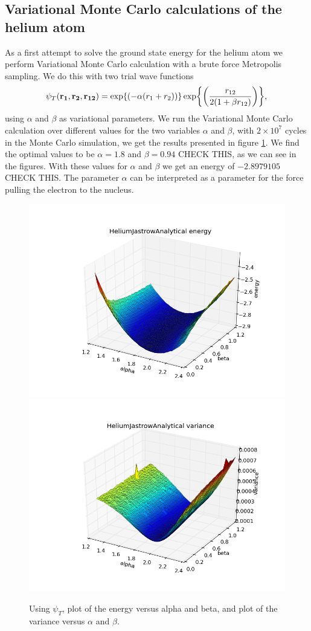 
	\subsection{Variational Monte Carlo calculations of the helium atom}
		As a first attempt to solve the ground state energy for the helium
		atom we perform Variational Monte Carlo calculation with a brute force
		Metropolis sampling. We do this with two trial wave functions
		\[
		\psi_{T}({\bf r_{1}},{\bf r_{2}},{\bf r_{12}})=\exp{\left(-\alpha(r_{1}+r_{2})\right)}\exp{\left(\frac{r_{12}}{2(1+\beta r_{12})}\right)},
		\]
		using $\alpha$ and $\beta$ as variational parameters. 
		We run the Variational Monte Carlo calculation over
		different values for the two variables $\alpha$ and $\beta$, 
		with $2\times10^{7}$ cycles in the Monte Carlo simulation, we get the results
		presented in figure \ref{fig:HeliumAlphaBeta}.
		We find the optimal values to be  $\alpha=1.8$ and $\beta=0.94$ CHECK THIS, as we can see in the figures.
		With these values for $\alpha$ and $\beta$ we get an energy of $-2.8979105$ CHECK THIS.
		The parameter $\alpha$ can be interpreted as a parameter for the
		force pulling the electron to the nucleus.


		


		\begin{figure}
			\centering \includegraphics[width=0.49\linewidth]{../figures/HeliumJastrowAnalytical_alpha_beta_energy}
			\includegraphics[width=0.49\linewidth]{../figures/HeliumJastrowAnalytical_alpha_beta_variance}
			\protect\caption{Using $\psi_{T}$, plot of the energy versus alpha and beta, and plot of the variance versus $\alpha$ and $\beta$. }
			\label{fig:HeliumAlphaBeta}
		\end{figure}


